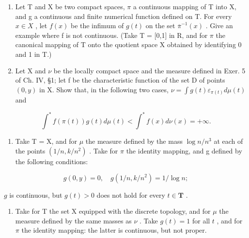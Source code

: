 \begin{enumerate}
\def\labelenumi{\arabic{enumi})}
\item
  Let T and X be two compact spaces, \(\pi\) a continuous mapping of T into X, and g a continuous and finite numerical function defined on T. For every \(x \in X\) , let \(f(x)\) be the infimum of \(g(t)\) on the set \(\overline{\pi}^{-1}(x)\) . Give an example where f is not continuous. (Take T = {[}0,1{]} in R, and for \(\pi\) the canonical mapping of T onto the quotient space X obtained by identifying 0 and 1 in T.)
\item
  Let X and \(\nu\) be the locally compact space and the measure defined in Exer. 5 of Ch. IV, §1; let f be the characteristic function of the set D of points \((0,y)\) in X. Show that, in the following two cases, \(\nu=\int g(t)\varepsilon_{\pi(t)}d\mu(t)\) and
\end{enumerate}

\[
\int^ {*} f (\pi (t)) g (t) d \mu (t) <   \int^ {*} f (x) d \nu (x) = + \infty .
\]

\begin{enumerate}
\def\labelenumi{\alph{enumi})}
\tightlist
\item
  Take T = X, and for \(\mu\) the measure defined by the mass \(\log n/n^{3}\) at each of the points \((1/n, k/n^{2})\) . Take for \(\pi\) the identity mapping, and g defined by the following conditions:
\end{enumerate}

\[
g (0, y) = 0, \quad g (1 / n, k / n ^ {2}) = 1 / \log n;
\]

\(g\) is continuous, but \(g(t) > 0\) does not hold for every \(t \in \mathbf{T}\) .

\begin{enumerate}
\def\labelenumi{\alph{enumi})}
\setcounter{enumi}{1}
\tightlist
\item
  Take for T the set X equipped with the discrete topology, and for \(\mu\) the measure defined by the same masses as \(\nu\) . Take \(g(t) = 1\) for all \(t\) , and for \(\pi\) the identity mapping: the latter is continuous, but not proper.
\end{enumerate}
